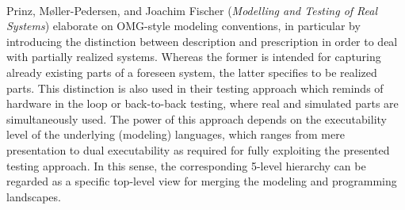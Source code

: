

\ \hline \ %

Prinz, M{\o}ller-Pedersen, and Joachim Fischer
\cite{isola-2016-prinz}
({\em Modelling and Testing of Real Systems})
elaborate on OMG-style modeling conventions, in particular by introducing the distinction between description and prescription in order to deal with partially realized systems. Whereas the former is intended for capturing already existing parts of a foreseen system, the latter specifies to be realized parts. This distinction is also used in their testing approach which reminds of hardware in the loop or back-to-back testing, where real and simulated parts are simultaneously used. The power of this approach depends on the executability level of the underlying (modeling) languages, which ranges from mere presentation to dual executability as required for fully exploiting the presented testing approach. In this sense, the corresponding 5-level hierarchy can be regarded as a specific top-level view for merging the modeling and programming landscapes.

\done{}